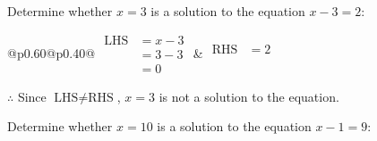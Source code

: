 \documentclass[12pt]{article}
\newcounter{minipagecount}
\begin{document}
\begin{multicols}{2}
\begin{minipage}[t]{0.40\textwidth}
    \noindent Determine whether \(x = 3\) is a solution to the equation \(x - 3 = 2\):
    \vspace{4pt}  %

    \noindent
    \renewcommand{\arraystretch}{1.3} %
    \begin{tabular}{@{}p{0.60\linewidth}@{}p{0.40\linewidth}@{}}
        \(\begin{aligned}
            \text{LHS} &= x - 3 \\
                    &= 3 - 3 \\
                    &= 0
        \end{aligned}\) &
        \(\begin{aligned}
            \text{RHS} &= 2\\
                    & \\
                    &
        \end{aligned}\)
    \end{tabular}
    \renewcommand{\arraystretch}{1.0} %
    \vspace{2pt}  %

    \noindent \(\therefore\) Since \(\text{LHS} \neq \text{RHS}\), \(x = 3\) is not  a solution to the equation.

\end{minipage}

 \vspace*{16pt}
\noindent{(\theminipagecount)}\hspace{0.1mm} %
\begin{minipage}[t]{0.40\textwidth} %

    \noindent Determine whether \(x = 10\) is a solution to the equation \(x - 1 = 9\):
    \vspace{4pt}  %


\end{minipage}
\end{multicols}
\end{document}
